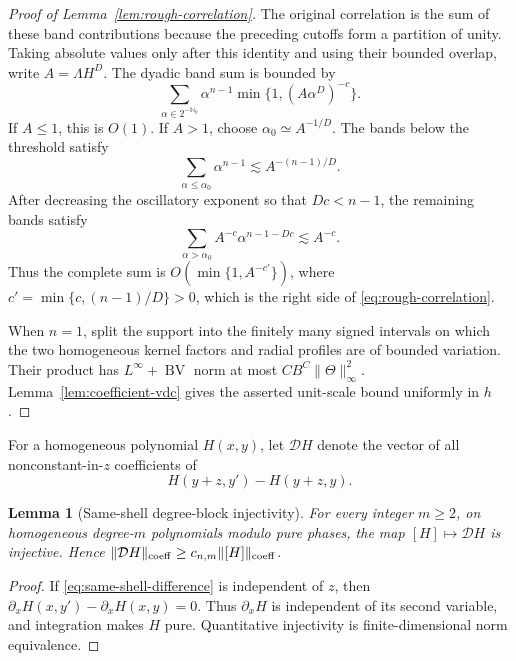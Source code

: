 \documentclass[11pt]{article}
\numberwithin{equation}{section}
\newtheorem{lemma}[theorem]{Lemma}
\theoremstyle{remark}
\theoremstyle{definition}
\newcommand{\norm}[1]{\lVert #1\rVert}
\newcommand{\BV}{\operatorname{BV}}
\begin{document}
\begin{proof}[Proof of Lemma~\ref{lem:rough-correlation}]
The original correlation is the sum of these band contributions because
the preceding cutoffs form a partition of unity.  Taking absolute values
only after this identity and using their bounded overlap, write
$A=\Lambda H^D$.  The dyadic band sum is bounded by
\[
 \sum_{\alpha\in2^{-\mathbb N_0}}
 \alpha^{n-1}\min\{1,(A\alpha^D)^{-c}\}.
\]
If $A\le1$, this is $O(1)$.  If $A>1$, choose
$\alpha_0\simeq A^{-1/D}$.  The bands below the threshold satisfy
\[
 \sum_{\alpha\le\alpha_0}\alpha^{n-1}
 \lesssim A^{-(n-1)/D}.
\]
After decreasing the oscillatory exponent so that $Dc<n-1$, the remaining
bands satisfy
\[
 \sum_{\alpha>\alpha_0}
 A^{-c}\alpha^{n-1-Dc}\lesssim A^{-c}.
\]
Thus the complete sum is
$O(\min\{1,A^{-c'}\})$, where
$c'=\min\{c,(n-1)/D\}>0$, which is the right side of
\eqref{eq:rough-correlation}.

When $n=1$, split the support into the finitely many signed intervals on
which the two homogeneous kernel factors and radial profiles are of
bounded variation.  Their product has $L^\infty+\BV$ norm at most
$CB^C\norm\Theta_\infty^2$.
Lemma~\ref{lem:coefficient-vdc} gives the asserted unit-scale bound
uniformly in $h$.
\end{proof}

For a homogeneous polynomial $H(x,y)$, let $\mathcal D H$ denote the
vector of all nonconstant-in-$z$ coefficients of
\begin{equation}\label{eq:same-shell-difference}
 H(y+z,y')-H(y+z,y).
\end{equation}

\begin{lemma}[Same-shell degree-block injectivity]
\label{lem:same-shell-injective}
For every integer $m\ge2$, on homogeneous degree-$m$ polynomials modulo
pure phases, the map
$[H]\mapsto\mathcal D H$ is injective.  Hence
$\norm{\mathcal D H}_{\rm coeff}\ge c_{n,m}\norm{[H]}_{\rm coeff}$.
\end{lemma}

\begin{proof}
If \eqref{eq:same-shell-difference} is independent of $z$, then
$\partial_xH(x,y')-\partial_xH(x,y)=0$.  Thus $\partial_xH$ is
independent of its second variable, and integration makes $H$ pure.
Quantitative injectivity is finite-dimensional norm equivalence.
\end{proof}
\end{document}
